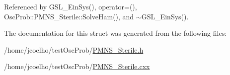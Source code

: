 Referenced by G\+S\+L\+\_\+\+Ein\+Sys(), operator=(), Osc\+Prob\+::\+P\+M\+N\+S\+\_\+\+Sterile\+::\+Solve\+Ham(), and $\sim$\+G\+S\+L\+\_\+\+Ein\+Sys().



The documentation for this struct was generated from the following files\+:\begin{DoxyCompactItemize}
\item 
/home/jcoelho/test\+Osc\+Prob/\hyperlink{PMNS__Sterile_8h}{P\+M\+N\+S\+\_\+\+Sterile.\+h}\item 
/home/jcoelho/test\+Osc\+Prob/\hyperlink{PMNS__Sterile_8cxx}{P\+M\+N\+S\+\_\+\+Sterile.\+cxx}\end{DoxyCompactItemize}
